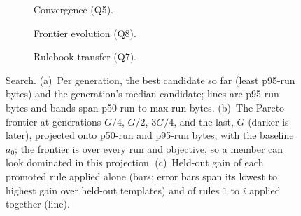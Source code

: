 \begin{figure}[t]
  \centering
  \begin{subfigure}[t]{0.32\textwidth}
    \centering
    
    \caption{Convergence (Q5).}
    \label{fig:convergence}
  \end{subfigure}\hfill
  \begin{subfigure}[t]{0.32\textwidth}
    \centering
    
    \caption{Frontier evolution (Q8).}
    \label{fig:frontier}
  \end{subfigure}\hfill
  \begin{subfigure}[t]{0.32\textwidth}
    \centering
    
    \caption{Rulebook transfer (Q7).}
    \label{fig:transfer}
  \end{subfigure}
  \caption{Search. (a)~Per generation, the best candidate so far (least
    p95-run bytes) and the generation's median candidate; lines are p95-run
    bytes and bands span p50-run to max-run bytes. (b)~The Pareto frontier at
    generations $G/4$, $G/2$, $3G/4$, and the last, $G$ (darker is later),
    projected onto p50-run and p95-run bytes, with the baseline $a_0$; the
    frontier is over every run and objective, so a member can look dominated
    in this projection. (c)~Held-out gain of each promoted rule applied alone
    (bars; error bars span its lowest to highest gain over held-out
    templates) and of rules $1$ to $i$ applied together (line).}
  \label{fig:results-search}
\end{figure}


